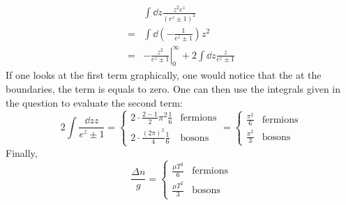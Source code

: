 \begin{enumerate}[label=(\alph*)]
\begin{align*}
   &\int \dd{z} \frac{z^2 e^z}{(e^z \pm 1)^2} \\
  =& \int \dd{ \left(- \frac{1}{e^z \pm 1} \right)} z^2 \\
  =& \left. -\frac{z^2}{e^z \pm 1} \right|_{0}^{\infty} + 2\int \dd{z} \frac{z}{e^z \pm 1} 
\end{align*}
If one looks at the first term graphically, one would notice that the at the boundaries, the term is equals to zero. One can then use the integrals given in the question to evaluate the second term:
\begin{equation*}
  2\int \frac{\dd{z}z}{e^z \pm 1} = 
\begin{cases}
   2\cdot\frac{2 - 1}{2} \pi^2 \frac{1}{6} & \text{fermions} \\
   2\cdot\frac{(2\pi)^2}{4}\frac{1}{6} & \text{bosons}
\end{cases}
=
\begin{cases}
   \frac{\pi^2}{6} & \text{fermions} \\
   \frac{\pi^2}{3} & \text{bosons}
\end{cases}
\end{equation*}
Finally,
\begin{equation}
\frac{\Delta n}{g} 	= 
\begin{cases}
   \frac{\mu T^2}{6} & \text{fermions} \\
   \frac{\mu T^2}{3} & \text{bosons}
\end{cases}
\end{equation}

\end{enumerate}

